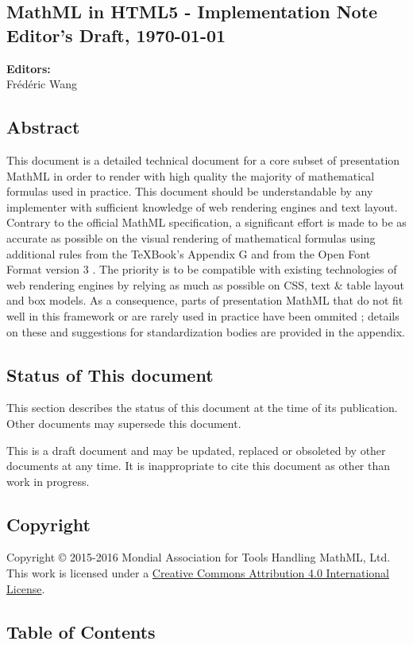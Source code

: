 \subsection*{MathML in HTML5 - Implementation Note\\Editor's Draft, \today}

\textbf{Editors:} \\
Frédéric Wang

\subsection*{Abstract}

This document is a detailed technical document for a core subset of presentation
MathML \cite{MathML3} in order to render with high quality the majority of
mathematical formulas used in practice.
This document should be understandable by any implementer with
sufficient knowledge of web rendering engines and text layout.
Contrary to the official MathML specification, a significant effort is made to
be as accurate as possible on the visual rendering of mathematical formulas
using additional rules from the \TeX Book's Appendix G \cite{TeXBook} and from
the Open Font Format version 3 \cite{OpenFontFormat3}.
The priority is to be compatible with existing technologies of web
rendering engines \cite{HTML5} by relying as much as possible on CSS, text \&
table layout and box models. As a consequence, parts of presentation MathML
that do not fit well in this framework or are rarely used in practice
have been ommited ; details on these and suggestions for standardization bodies
are provided in the appendix.

\subsection*{Status of This document}

This section describes the status of this document at the time of its
publication. Other documents may supersede this document.

This is a draft document and may be updated, replaced or obsoleted by other
documents at any time. It is inappropriate to cite this document as other than
work in progress.

\subsection*{Copyright}

Copyright © 2015-2016 Mondial Association for Tools Handling MathML, Ltd.
This work is licensed under a
\href{http://creativecommons.org/licenses/by/4.0}{Creative Commons Attribution 4.0 International License}.

\subsection*{Table of Contents}

\renewcommand\contentsname{}
\tableofcontents
